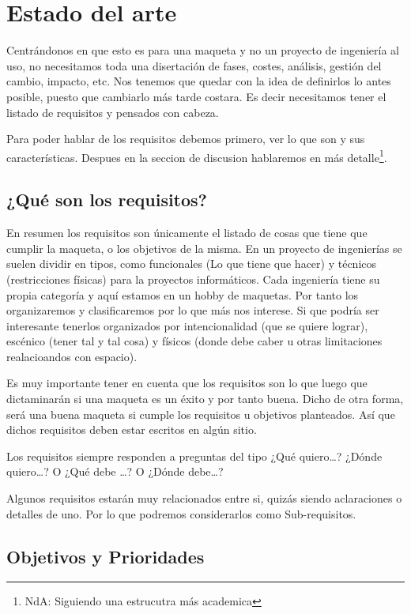 \section{Estado del arte}
Centrándonos en que esto es para una maqueta y no un proyecto de ingeniería al uso,
no necesitamos toda una disertación de fases, costes, análisis, gestión del cambio, impacto, etc.
Nos tenemos que quedar con la idea de definirlos lo antes posible, puesto que cambiarlo más tarde costara.
Es decir necesitamos tener el listado de requisitos y pensados con cabeza.

Para poder hablar de los requisitos debemos primero, ver lo que son y sus características. Despues en la seccion
de discusion hablaremos en más detalle\footnote{NdA: Siguiendo una estrucutra más academica}.

\subsection{¿Qué son los requisitos?}

En resumen los requisitos son únicamente el listado de cosas que tiene que cumplir la maqueta, o los objetivos
de la misma. En un proyecto de ingenierías se suelen dividir en tipos, como funcionales (Lo que tiene que hacer)
y técnicos (restricciones físicas) para la proyectos informáticos.
Cada ingeniería tiene su propia categoría y aquí estamos en un hobby de maquetas.
Por tanto los organizaremos y clasificaremos por lo que más nos interese.
Si que podría ser interesante tenerlos organizados por intencionalidad (que se quiere lograr),
escénico (tener tal y tal cosa) y físicos (donde debe caber u otras limitaciones realacioandos con espacio).

Es muy importante tener en cuenta que los requisitos son lo que luego que dictaminarán si una maqueta es un
éxito y por tanto buena. Dicho de otra forma, será una buena maqueta si cumple los requisitos u objetivos
planteados. Así que dichos requisitos deben estar escritos en algún sitio.

Los requisitos siempre responden a preguntas del tipo ¿Qué quiero…? ¿Dónde quiero…?
O ¿Qué debe …? O ¿Dónde debe…?

Algunos requisitos estarán muy relacionados entre si, quizás siendo aclaraciones o detalles de uno.
Por lo que podremos considerarlos como Sub-requisitos.

\subsection{Objetivos y Prioridades}

